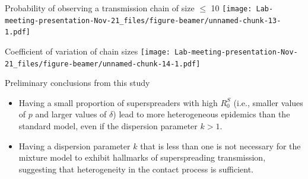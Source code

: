 \documentclass[
  ignorenonframetext,
]{beamer}
\begin{document}
\begin{frame}{Probability of observing a transmission chain of size
\(\leq\) 10}
\protect\hypertarget{probability-of-observing-a-transmission-chain-of-size-leq-10}{}
\texttt{[image: Lab-meeting-presentation-Nov-21\_files/figure-beamer/unnamed-chunk-13-1.pdf]}
\end{frame}

\begin{frame}{Coefficient of variation of chain sizes}
\protect\hypertarget{coefficient-of-variation-of-chain-sizes}{}
\texttt{[image: Lab-meeting-presentation-Nov-21\_files/figure-beamer/unnamed-chunk-14-1.pdf]}
\end{frame}

\begin{frame}{Preliminary conclusions from this study}
\protect\hypertarget{preliminary-conclusions-from-this-study}{}
\begin{itemize}
\item
  Having a small proportion of superspreaders with high \(R_0^S\) (i.e.,
  smaller values of \(p\) and larger values of \(\delta\)) lead to more
  heterogeneous epidemics than the standard model, even if the
  dispersion parameter \(k>1\).
\item
  Having a dispersion parameter \(k\) that is less than one is not
  necessary for the mixture model to exhibit hallmarks of superspreading
  transmission, suggesting that heterogeneity in the contact process is
  sufficient.
\end{itemize}
\end{frame}
\end{document}
